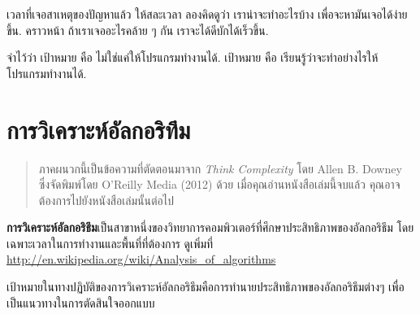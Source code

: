 
เวลาที่เจอสาเหตุของปัญหาแล้ว
ให้สละเวลา ลองคิดดูว่า เราน่าจะทำอะไรบ้าง
เพื่อจะหามันเจอได้ง่ายขึ้น.
คราวหน้า ถ้าเราเจออะไรคล้าย ๆ กัน
เราจะได้ดีบักได้เร็วขึ้น.


จำไว้ว่า
เป้าหมาย คือ ไม่ใช่แค่ให้โปรแกรมทำงานได้.
เป้าหมาย คือ เรียนรู้ว่าจะทำอย่างไรให้โปรแกรมทำงานได้.

\chapter{การวิเคราะห์อัลกอริทึม} %
\label{algorithms}

\begin{quote}

ภาคผนวกนี้เป็นข้อความที่ตัดตอนมาจาก {\it Think Complexity} โดย Allen B. Downey 
ซึ่งจัดพิมพ์โดย O'Reilly Media (2012) ด้วย เมื่อคุณอ่านหนังสือเล่มนี้จบแล้ว คุณอาจต้องการไปยังหนังสือเล่มนั้นต่อไป
\end{quote}


{\bf การวิเคราะห์อัลกอริธึม}เป็นสาขาหนึ่งของวิทยาการคอมพิวเตอร์ที่ศึกษาประสิทธิภาพของอัลกอริธึม 
โดยเฉพาะเวลาในการทำงานและพื้นที่ที่ต้องการ ดูเพิ่มที่ \url{http://en.wikipedia.org/wiki/Analysis_of_algorithms}
 


เป้าหมายในทางปฏิบัติของการวิเคราะห์อัลกอริธึมคือการทำนายประสิทธิภาพของอัลกอริธึมต่างๆ เพื่อเป็นแนวทางในการตัดสินใจออกแบบ


